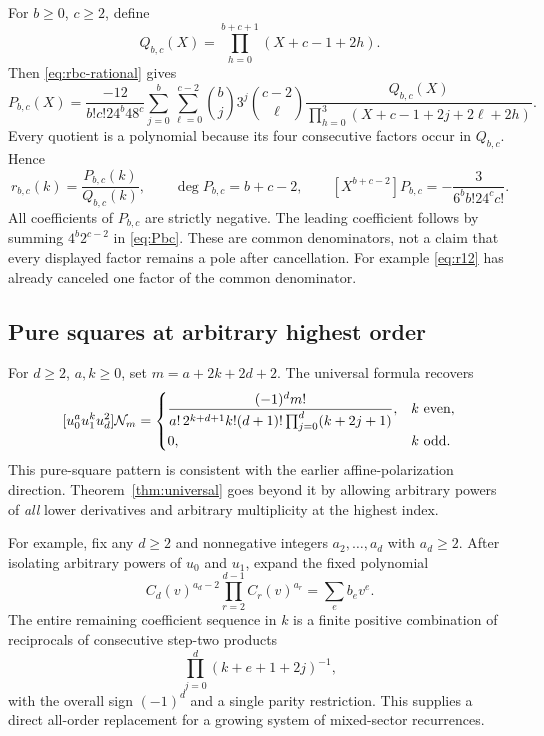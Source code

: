 For $b\ge0$, $c\ge2$, define
\[
 Q_{b,c}(X)=\prod_{h=0}^{b+c+1}(X+c-1+2h).
\]
Then \eqref{eq:rbc-rational} gives
\begin{equation}\label{eq:Pbc}
 P_{b,c}(X)=\frac{-12}{b!c!24^b48^c}
 \sum_{j=0}^{b}\sum_{\ell=0}^{c-2}\binom bj3^j\binom{c-2}{\ell}
 \frac{Q_{b,c}(X)}{\prod_{h=0}^{3}(X+c-1+2j+2\ell+2h)}.
\end{equation}
Every quotient is a polynomial because its four consecutive factors occur in $Q_{b,c}$. Hence
\begin{equation}\label{eq:mixed-numerator}
 r_{b,c}(k)=\frac{P_{b,c}(k)}{Q_{b,c}(k)},\qquad
 \deg P_{b,c}=b+c-2,
 \qquad
 [X^{b+c-2}]P_{b,c}=-\frac3{6^b b!24^c c!}.
\end{equation}
All coefficients of $P_{b,c}$ are strictly negative. The leading coefficient follows by summing $4^b2^{c-2}$ in \eqref{eq:Pbc}. These are common denominators, not a claim that every displayed factor remains a pole after cancellation. For example \eqref{eq:r12} has already canceled one factor of the common denominator.

\subsection{Pure squares at arbitrary highest order}

For $d\ge2$, $a,k\ge0$, set $m=a+2k+2d+2$. The universal formula recovers
\begin{equation}\label{eq:all-square}
 [u_0^au_1^ku_d^2]\mathcal N_m
 =\begin{cases}
 \displaystyle\frac{(-1)^dm!}
 {a!\,2^{k+d+1}k!(d+1)!\prod_{j=0}^d(k+2j+1)},& k\text{ even},\\[5pt]
 0,&k\text{ odd}.
 \end{cases}
\end{equation}
This pure-square pattern is consistent with the earlier affine-polarization direction. Theorem~\ref{thm:universal} goes beyond it by allowing arbitrary powers of \emph{all} lower derivatives and arbitrary multiplicity at the highest index.

For example, fix any $d\ge2$ and nonnegative integers $a_2,\ldots,a_d$ with $a_d\ge2$. After isolating arbitrary powers of $u_0$ and $u_1$, expand the fixed polynomial
\[
 C_d(v)^{a_d-2}\prod_{r=2}^{d-1}C_r(v)^{a_r}=
 \sum_e b_e v^e.
\]
The entire remaining coefficient sequence in $k$ is a finite positive combination of reciprocals of consecutive step-two products
\[
 \prod_{j=0}^d(k+e+1+2j)^{-1},
\]
with the overall sign $(-1)^d$ and a single parity restriction. This supplies a direct all-order replacement for a growing system of mixed-sector recurrences.

